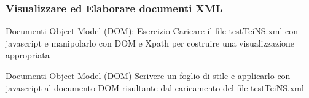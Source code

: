 \begin{frame}
    \frametitle{Visualizzare ed Elaborare documenti XML}
    \addtocounter{nframe}{1}
    

     \begin{block}{Documenti Object Model (DOM): Esercizio}
       Caricare il file testTeiNS.xml con javascript e manipolarlo con DOM e Xpath per costruire una visualizzazione appropriata
     \end{block}

     \begin{block}{Documenti Object Model (DOM)}
        Scrivere un foglio di stile e applicarlo con javascript al documento DOM risultante dal caricamento del file testTeiNS.xml
     \end{block}


\end{frame}